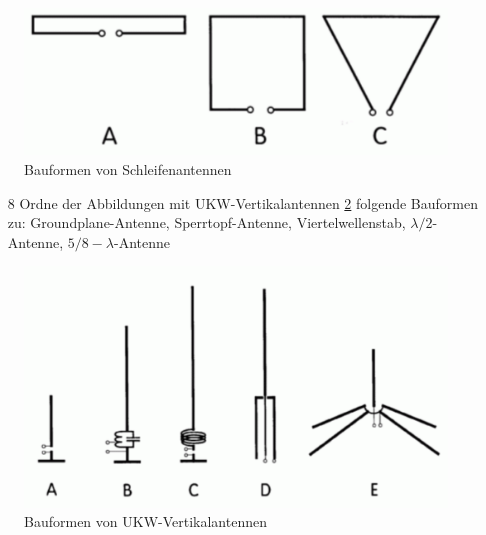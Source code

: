 \begin{figure}[H]
	\centering
	\includegraphics[scale=0.4]{Antennen/Bilder/Schleifen.pdf}
	\caption{Bauformen von Schleifenantennen}
	\label{schleifen}
\end{figure}


\begin{enumerate} 
\itemsep1pt\parskip0pt
\item[8] Ordne der Abbildungen mit UKW-Vertikalantennen \ref{ukw} folgende Bauformen zu: Groundplane-Antenne, Sperrtopf-Antenne, Viertelwellenstab, $\lambda/2$-Antenne, $5/8- \lambda$-Antenne
\end{enumerate}

\begin{figure}[H]
	\centering
	\includegraphics[scale=0.4]{Antennen/Bilder/ukw.pdf}
	\caption{Bauformen von UKW-Vertikalantennen}
	\label{ukw}
\end{figure}


